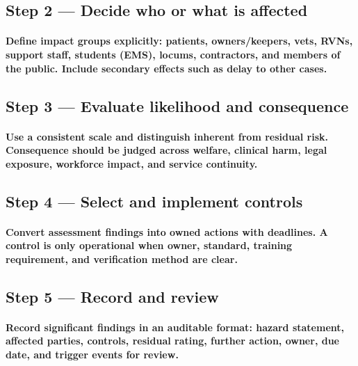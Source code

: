 \subsection{Step 2 — Decide who or what is affected}
\paragraph{Define impact groups explicitly: patients, owners/keepers, vets, RVNs, support staff, students (EMS), locums, contractors, and members of the public. Include secondary effects such as delay to other cases.}

\subsection{Step 3 — Evaluate likelihood and consequence}
\paragraph{Use a consistent scale and distinguish inherent from residual risk. Consequence should be judged across welfare, clinical harm, legal exposure, workforce impact, and service continuity.}

\subsection{Step 4 — Select and implement controls}
\paragraph{Convert assessment findings into owned actions with deadlines. A control is only operational when owner, standard, training requirement, and verification method are clear.}

\subsection{Step 5 — Record and review}
\paragraph{Record significant findings in an auditable format: hazard statement, affected parties, controls, residual rating, further action, owner, due date, and trigger events for review.}


